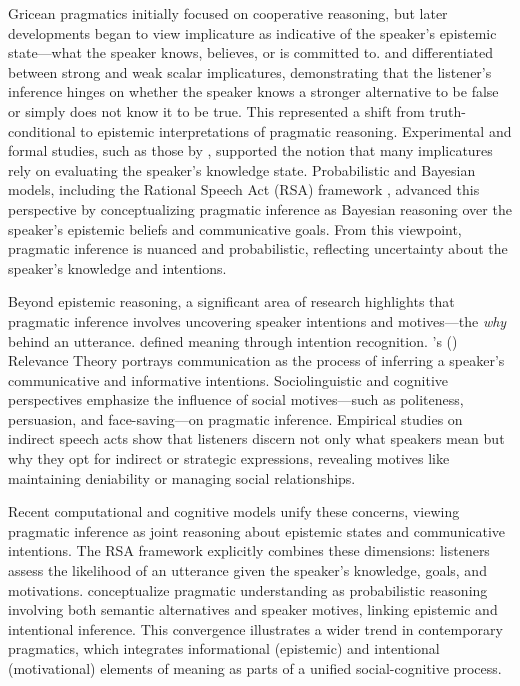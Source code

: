 \documentclass[12pt,a4paper]{article}
\begin{document}
Gricean pragmatics initially focused on cooperative reasoning, but later
developments began to view implicature as indicative of the speaker's epistemic
state---what the speaker knows, believes, or is committed to. \citet{sauerland2004}
and \citet{Spector2007} differentiated between strong and weak scalar
implicatures, demonstrating that the listener's inference hinges on whether the
speaker knows a stronger alternative to be false or simply does not know it to
be true. This represented a shift from truth-conditional to epistemic
interpretations of pragmatic reasoning. Experimental and formal studies, such as
those by \citet{ChemlaSingh2014a}, supported the notion that many implicatures
rely on evaluating the speaker's knowledge state. Probabilistic and Bayesian
models, including the Rational Speech Act (RSA) framework
\citep{frank2012,GoodmanStuhlmuller2013,PottsLassiterLevyFrank2016}, advanced
this perspective by conceptualizing pragmatic inference as Bayesian reasoning
over the speaker's epistemic beliefs and communicative goals. From this
viewpoint, pragmatic inference is nuanced and probabilistic, reflecting
uncertainty about the speaker's knowledge and intentions.

Beyond epistemic reasoning, a significant area of research highlights that
pragmatic inference involves uncovering speaker intentions and motives---the
\emph{why} behind an utterance. \citet{Grice1957} defined meaning through
intention recognition. \citeauthor{SperberWilson1995}'s
(\citeyear{SperberWilson1995}) Relevance Theory portrays communication as the
process of inferring a speaker's communicative and informative intentions.
Sociolinguistic and cognitive perspectives \citep[e.g.,][]{brownlevinson1987,Tomasello2003}
emphasize the influence of social motives---such as politeness, persuasion, and
face-saving---on pragmatic inference. Empirical studies on indirect speech acts
\citep[e.g.,][]{Gibbs1986,LeePinker2010} show that listeners discern not only
what speakers mean but why they opt for indirect or strategic expressions,
revealing motives like maintaining deniability or managing social relationships.

Recent computational and cognitive models unify these concerns, viewing
pragmatic inference as joint reasoning about epistemic states and communicative
intentions. The RSA framework \citep{frank2012,goodman2016} explicitly combines
these dimensions: listeners assess the likelihood of an utterance given the
speaker's knowledge, goals, and motivations. \citet{bergen2016} conceptualize
pragmatic understanding as probabilistic reasoning involving both semantic
alternatives and speaker motives, linking epistemic and intentional inference.
This convergence illustrates a wider trend in contemporary pragmatics, which
integrates informational (epistemic) and intentional (motivational) elements of
meaning as parts of a unified social-cognitive process.
\end{document}
